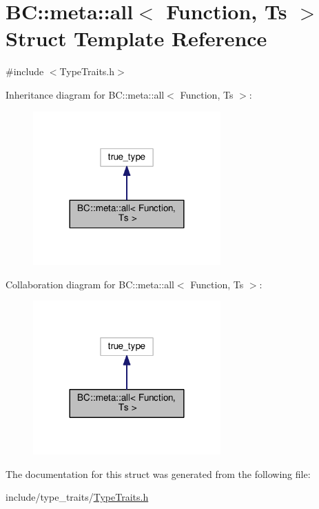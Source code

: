 \hypertarget{structBC_1_1meta_1_1all}{}\section{BC\+:\+:meta\+:\+:all$<$ Function, Ts $>$ Struct Template Reference}
\label{structBC_1_1meta_1_1all}


{\ttfamily \#include $<$Type\+Traits.\+h$>$}



Inheritance diagram for BC\+:\+:meta\+:\+:all$<$ Function, Ts $>$\+:
\nopagebreak
\begin{figure}[H]
\begin{center}
\leavevmode
\includegraphics[width=204pt]{structBC_1_1meta_1_1all__inherit__graph}
\end{center}
\end{figure}


Collaboration diagram for BC\+:\+:meta\+:\+:all$<$ Function, Ts $>$\+:
\nopagebreak
\begin{figure}[H]
\begin{center}
\leavevmode
\includegraphics[width=204pt]{structBC_1_1meta_1_1all__coll__graph}
\end{center}
\end{figure}


The documentation for this struct was generated from the following file\+:\begin{DoxyCompactItemize}
\item 
include/type\+\_\+traits/\hyperlink{TypeTraits_8h}{Type\+Traits.\+h}\end{DoxyCompactItemize}
